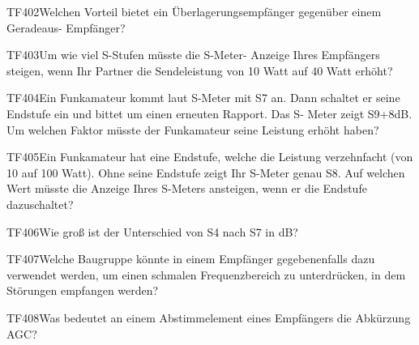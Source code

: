 \begin{question}{TF402}{Welchen Vorteil bietet ein Überlagerungsempfänger gegenüber einem Geradeaus- Empfänger?}
\end{question}

\begin{question}{TF403}{Um wie viel S-Stufen müsste die S-Meter- Anzeige Ihres Empfängers steigen, wenn Ihr Partner die Sendeleistung von 10 Watt auf 40 Watt erhöht?}
\end{question}

\begin{question}{TF404}{Ein Funkamateur kommt laut S-Meter mit S7 an. Dann schaltet er seine Endstufe ein und bittet um einen erneuten Rapport. Das S- Meter zeigt S9+8dB. Um welchen Faktor müsste der Funkamateur seine Leistung erhöht haben?}
\end{question}

\begin{question}{TF405}{Ein Funkamateur hat eine Endstufe, welche die Leistung verzehnfacht (von 10 auf 100 Watt). Ohne seine Endstufe zeigt Ihr S-Meter genau S8. Auf welchen Wert müsste die Anzeige Ihres S-Meters ansteigen, wenn er die Endstufe dazuschaltet?}
\end{question}

\begin{question}{TF406}{Wie groß ist der Unterschied von S4 nach S7 in dB?}
\end{question}

\begin{question}{TF407}{Welche Baugruppe könnte in einem Empfänger gegebenenfalls dazu verwendet werden, um einen schmalen Frequenzbereich zu unterdrücken, in dem Störungen empfangen werden?}
\end{question}

\begin{question}{TF408}{Was bedeutet an einem Abstimmelement eines Empfängers die Abkürzung AGC?}
\end{question}


